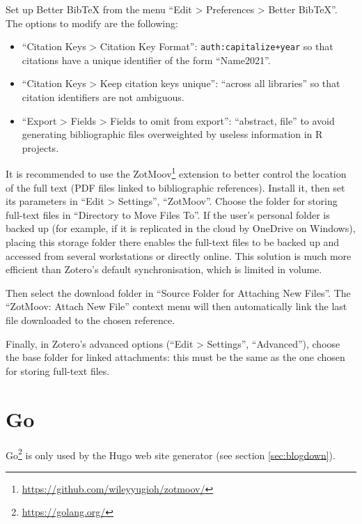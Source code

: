 \documentclass[
  12pt,
  american,
  a4paper,
  extrafontsizes,onecolumn,openright
  ]{memoir}
\providecommand{\tightlist}{%
  \setlength{\itemsep}{0pt}\setlength{\parskip}{0pt}}
\begin{document}
Set up Better BibTeX from the menu \enquote{Edit \textgreater{} Preferences \textgreater{} Better BibTeX}.
The options to modify are the following:

\begin{itemize}
\tightlist
\item
  \enquote{Citation Keys \textgreater{} Citation Key Format}: \texttt{auth:capitalize+year} so that citations have a unique identifier of the form \enquote{Name2021}.
\item
  \enquote{Citation Keys \textgreater{} Keep citation keys unique}: \enquote{across all libraries} so that citation identifiers are not ambiguous.
\item
  \enquote{Export \textgreater{} Fields \textgreater{} Fields to omit from export}: \enquote{abstract, file} to avoid generating bibliographic files overweighted by useless information in R projects.
\end{itemize}

It is recommended to use the ZotMoov\footnote{\url{https://github.com/wileyyugioh/zotmoov/}} extension to better control the location of the full text (PDF files linked to bibliographic references).
Install it, then set its parameters in \enquote{Edit \textgreater{} Settings}, \enquote{ZotMoov}.
Choose the folder for storing full-text files in \enquote{Directory to Move Files To}.
If the user's personal folder is backed up (for example, if it is replicated in the cloud by OneDrive on Windows), placing this storage folder there enables the full-text files to be backed up and accessed from several workstations or directly online.
This solution is much more efficient than Zotero's default synchronisation, which is limited in volume.

Then select the download folder in \enquote{Source Folder for Attaching New Files}.
The \enquote{ZotMoov: Attach New File} context menu will then automatically link the last file downloaded to the chosen reference.

Finally, in Zotero's advanced options (\enquote{Edit \textgreater{} Settings}, \enquote{Advanced}), choose the base folder for linked attachments: this must be the same as the one chosen for storing full-text files.

\section{Go}\label{go}

Go\footnote{\url{https://golang.org/}} is only used by the Hugo web site generator (see section \ref{sec:blogdown}).
\end{document}
